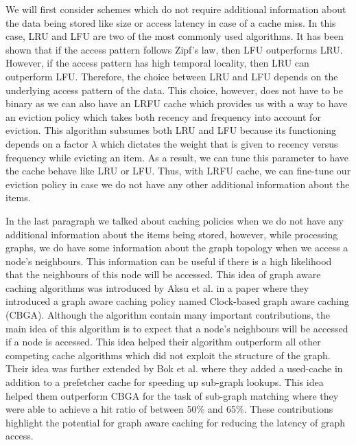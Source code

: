 \medskip
We will first consider schemes which do not require additional information about
the data being stored like size or access latency in case of a cache miss. In
this case, LRU and LFU are two of the most commonly used algorithms. It has been
shown that if the access pattern follows Zipf's law\cite{zipf1929relative}, then
LFU outperforms LRU. However, if the access pattern has high temporal locality,
then LRU can outperform LFU. Therefore, the choice between LRU and LFU depends
on the underlying access pattern of the data. This choice, however, does not
have to be binary as we can also have an LRFU cache\cite{lee2001lrfu} which
provides us with a way to have an eviction policy which takes both recency and
frequency into account for eviction. This algorithm subsumes both LRU and LFU
because its functioning depends on a factor $\lambda$ which dictates the
weight that is given to recency versus frequency while evicting an item. As a
result, we can tune this parameter to have the cache behave like LRU or LFU.
Thus, with LRFU cache, we can fine-tune our eviction policy in case we do not
have any other additional information about the items.

\medskip
In the last paragraph we talked about caching policies when we do not have any
additional information about the items being stored, however, while processing
graphs, we do have some information about the graph topology when we access a
node's neighbours. This information can be useful if there is a high likelihood
that the neighbours of this node will be accessed. This idea of graph aware
caching algorithms was introduced by Aksu et al. in a paper where they
introduced a graph aware caching policy named Clock-based graph aware
caching (CBGA)\cite{aksu2015graph}. Although the algorithm contain many 
important contributions, the
main idea of this algorithm is to expect that a node's neighbours will be
accessed if a node is accessed. This idea helped their algorithm outperform all
other competing cache algorithms which did not exploit the structure of the
graph. Their idea was further extended by Bok et al.\cite{bok2020memory} where
they added a used-cache in addition to a prefetcher cache for speeding up
sub-graph lookups. This idea helped them outperform CBGA for the task of sub-graph
matching where they were able to achieve a hit ratio of between 50\% and 65\%. 
These contributions highlight the potential for graph aware caching for
reducing the latency of graph access.
